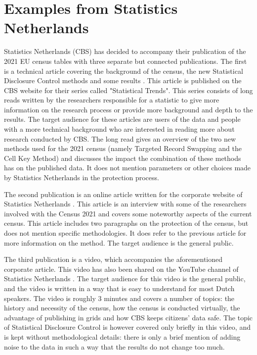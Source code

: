 \section{Examples from Statistics Netherlands}

Statistics Netherlands (CBS) has decided to accompany their publication of the 2021 EU census tables with three separate but connected publications. The first is a technical article covering the background of the census, the new Statistical Disclosure Control methods and some results \cite{CBS-ST}. This article is published on the CBS website for their series called "Statistical Trends". This series consists of long reads written by the researchers responsible for a statistic to give more information on the research process or provide more background and depth to the results. The target audience for these articles are users of the data and people with a more technical background who are interested in reading more about research conducted by CBS. The long read gives an overview of the two new methods used for the 2021 census (namely Targeted Record Swapping and the Cell Key Method) and discusses the impact the combination of these methods has on the published data. It does not mention parameters or other choices made by Statistics Netherlands in the protection process.

The second publication is an online article written for the corporate website of Statistics Netherlands \cite{CBS-Corporate}. This article is an interview with some of the researchers involved with the Census 2021 and covers some noteworthy aspects of the current census. This article includes two paragraphs on the protection of the census, but does not mention specific methodologies. It does refer to the previous article for more information on the method. The target audience is the general public.

The third publication is a video, which accompanies the aforementioned corporate article. This video has also been shared on the YouTube channel of Statistics Netherlands \cite{CBS-Youtube}. The target audience for this video is the general public, and the video is written in a way that is easy to understand for most Dutch speakers. The video is roughly 3 minutes and covers a number of topics: the history and necessity of the census, how the census is conducted virtually, the advantage of publishing in grids and how CBS keeps citizens' data safe. The topic of Statistical Disclosure Control is however covered only briefly in this video, and is kept without methodological details: there is only a brief mention of adding noise to the data in such a way that the results do not change too much. 










